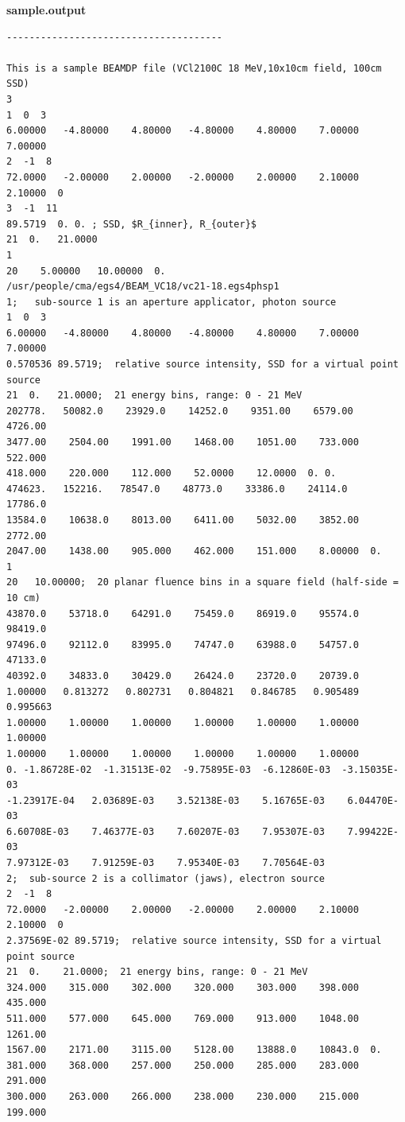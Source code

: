 \documentclass[12pt,twoside]{article}
\begin{document}
{\bf sample.output}
\begin{verbatim}
--------------------------------------

This is a sample BEAMDP file (VCl2100C 18 MeV,10x10cm field, 100cm SSD)
3
1  0  3
6.00000   -4.80000    4.80000   -4.80000    4.80000    7.00000    7.00000
2  -1  8
72.0000   -2.00000    2.00000   -2.00000    2.00000    2.10000    2.10000  0
3  -1  11
89.5719  0. 0. ; SSD, $R_{inner}, R_{outer}$
21  0.   21.0000
1
20    5.00000   10.00000  0.
/usr/people/cma/egs4/BEAM_VC18/vc21-18.egs4phsp1
1;   sub-source 1 is an aperture applicator, photon source
1  0  3
6.00000   -4.80000    4.80000   -4.80000    4.80000    7.00000    7.00000
0.570536 89.5719;  relative source intensity, SSD for a virtual point source
21  0.   21.0000;  21 energy bins, range: 0 - 21 MeV
202778.   50082.0    23929.0    14252.0    9351.00    6579.00    4726.00
3477.00    2504.00    1991.00    1468.00    1051.00    733.000    522.000
418.000    220.000    112.000    52.0000    12.0000  0. 0.
474623.   152216.   78547.0    48773.0    33386.0    24114.0    17786.0
13584.0    10638.0    8013.00    6411.00    5032.00    3852.00    2772.00
2047.00    1438.00    905.000    462.000    151.000    8.00000  0.
1
20   10.00000;  20 planar fluence bins in a square field (half-side = 10 cm)
43870.0    53718.0    64291.0    75459.0    86919.0    95574.0    98419.0
97496.0    92112.0    83995.0    74747.0    63988.0    54757.0    47133.0
40392.0    34833.0    30429.0    26424.0    23720.0    20739.0
1.00000   0.813272   0.802731   0.804821   0.846785   0.905489   0.995663
1.00000    1.00000    1.00000    1.00000    1.00000    1.00000    1.00000
1.00000    1.00000    1.00000    1.00000    1.00000    1.00000
0. -1.86728E-02  -1.31513E-02  -9.75895E-03  -6.12860E-03  -3.15035E-03
-1.23917E-04   2.03689E-03    3.52138E-03    5.16765E-03    6.04470E-03
6.60708E-03    7.46377E-03    7.60207E-03    7.95307E-03    7.99422E-03
7.97312E-03    7.91259E-03    7.95340E-03    7.70564E-03
2;  sub-source 2 is a collimator (jaws), electron source
2  -1  8
72.0000   -2.00000    2.00000   -2.00000    2.00000    2.10000    2.10000  0
2.37569E-02 89.5719;  relative source intensity, SSD for a virtual point source
21  0.    21.0000;  21 energy bins, range: 0 - 21 MeV
324.000    315.000    302.000    320.000    303.000    398.000    435.000
511.000    577.000    645.000    769.000    913.000    1048.00    1261.00
1567.00    2171.00    3115.00    5128.00    13888.0    10843.0  0.
381.000    368.000    257.000    250.000    285.000    283.000    291.000
300.000    263.000    266.000    238.000    230.000    215.000    199.000

\end{verbatim}
\end{document}
